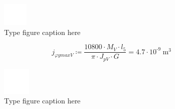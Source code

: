 \documentclass{article}
\newcommand{\defeq}{\coloneq} %
\begin{document}
\begin{figure}[h!]
 \begin{center}
  \includegraphics[max width=\textwidth]{calculations/913.png}
  \caption{Type figure caption here}
  \label{fig:913}
 \end{center}
\end{figure}
\begin{equation*}
j_{φymaxV} \defeq \frac{10800 \cdot M_{V} \cdot \textit{l}_{\textit{5}}}{{\pi} \cdot J_{pV} \cdot G} = {4.7 \cdot 10^{ \operatorname{-} 9} \: \mathrm{m}^{3}}
\end{equation*}
\begin{figure}[h!]
 \begin{center}
  \includegraphics[max width=\textwidth]{calculations/915.png}
  \caption{Type figure caption here}
  \label{fig:915}
 \end{center}
\end{figure}
\end{document}
